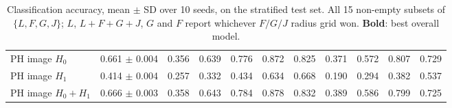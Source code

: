 \begin{table}[ht]
\begin{tabular}{@{}l c cccc ccccc@{}}
PH image $H_0$ & 0.661 $\pm$ 0.004 & 0.356 & 0.639 & 0.776 & 0.872 & 0.825 & 0.371 & 0.572 & 0.807 & 0.729\\
PH image $H_1$ & 0.414 $\pm$ 0.004 & 0.257 & 0.332 & 0.434 & 0.634 & 0.668 & 0.190 & 0.294 & 0.382 & 0.537\\
PH image $H_0{+}H_1$ & 0.666 $\pm$ 0.003 & 0.358 & 0.643 & 0.784 & 0.878 & 0.832 & 0.389 & 0.586 & 0.799 & 0.725\\
\bottomrule
\end{tabular}
\caption{Classification accuracy, mean $\pm$ SD over 10 seeds, on the stratified test set. All 15 non-empty subsets of $\{L,F,G,J\}$; $L$, $L{+}F{+}G{+}J$, $G$ and $F$ report whichever $F/G/J$ radius grid won. \textbf{Bold}: best overall model.}
\label{tab:classify}
\end{table}
